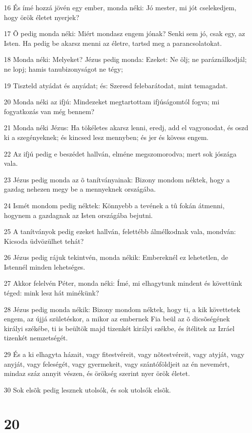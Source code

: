 \par 16 És ímé hozzá jövén egy ember, monda néki: Jó mester, mi jót cselekedjem, hogy örök életet nyerjek?
\par 17 Õ pedig monda néki: Miért mondasz engem jónak? Senki sem jó, csak egy, az Isten. Ha pedig be akarsz menni az életre, tartsd meg a parancsolatokat.
\par 18 Monda néki: Melyeket? Jézus pedig monda: Ezeket: Ne ölj; ne paráználkodjál; ne lopj; hamis tanubizonyságot ne tégy;
\par 19 Tiszteld atyádat és anyádat; és: Szeresd felebarátodat, mint temagadat.
\par 20 Monda néki az ifjú: Mindezeket megtartottam ifjúságomtól fogva; mi fogyatkozás van még bennem?
\par 21 Monda néki Jézus: Ha tökéletes akarsz lenni, eredj, add el vagyonodat, és oszd ki a szegényeknek; és kincsed lesz mennyben; és jer és kövess engem.
\par 22 Az ifjú pedig e beszédet hallván, elméne megszomorodva; mert sok jószága vala.
\par 23 Jézus pedig monda az õ tanítványainak: Bizony mondom néktek, hogy a gazdag nehezen megy be a mennyeknek országába.
\par 24 Ismét mondom pedig néktek: Könnyebb a tevének a tû fokán átmenni, hogynem a gazdagnak az Isten országába bejutni.
\par 25 A tanítványok pedig ezeket hallván, felettébb álmélkodnak vala, mondván: Kicsoda üdvözülhet tehát?
\par 26 Jézus pedig rájuk tekintvén, monda nékik: Embereknél ez lehetetlen, de Istennél minden lehetséges.
\par 27 Akkor felelvén Péter, monda néki: Ímé, mi elhagytunk mindent és követtünk téged: mink lesz hát minékünk?
\par 28 Jézus pedig monda nékik: Bizony mondom néktek, hogy ti, a kik követtetek engem, az újjá születéskor, a mikor az embernek Fia beül az õ dicsõségének királyi székébe, ti is beültök majd tizenkét királyi székbe, és ítélitek az Izráel tizenkét nemzetségét.
\par 29 És a ki elhagyta házait, vagy fitestvéreit, vagy nõtestvéreit, vagy atyját, vagy anyját, vagy feleségét, vagy gyermekeit, vagy szántóföldjeit az én nevemért, mindaz száz annyit vészen, és örökség szerint nyer örök életet.
\par 30 Sok elsõk pedig lesznek utolsók, és sok utolsók elsõk.

\chapter{20}

